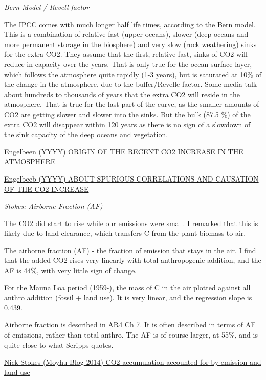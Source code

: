 \documentclass[
]{book}
\begin{document}
\emph{Bern Model / Revell factor}

The IPCC comes with much longer half life times, according to the Bern model. This is a combination of relative fast (upper oceans), slower (deep oceans and more permanent storage in the biosphere) and very slow (rock weathering) sinks for the extra CO2. They assume that the first, relative fast, sinks of CO2 will reduce in capacity over the years. That is only true for the ocean surface layer, which follows the atmosphere quite rapidly (1-3 years), but is saturated at 10\% of the change in the atmosphere, due to the buffer/Revelle factor. Some media talk about hundreds to thousands of years that the extra CO2 will reside in the atmosphere. That is true for the last part of the curve, as the smaller amounts of CO2 are getting slower and slower into the sinks. But the bulk (87.5 \%) of the extra CO2 will disappear within 120 years as there is no sign of a slowdown of the sink capacity of the deep oceans and vegetation.

\href{http://www.ferdinand-engelbeen.be/klimaat/co2_origin.html}{Engelbeen (YYYY) ORIGIN OF THE RECENT CO2 INCREASE IN THE ATMOSPHERE}

\href{http://www.ferdinand-engelbeen.be/klimaat/co2_variability.html}{Engelbeeb (YYYY) ABOUT SPURIOUS CORRELATIONS AND CAUSATION OF THE CO2 INCREASE}

\emph{Stokes: Airborne Fraction (AF)}

The CO2 did start to rise while our emissions were small. I remarked that this is likely due to land clearance, which transfers C from the plant biomass to air.

The airborne fraction (AF) - the fraction of emission that stays in the air. I find that the added CO2 rises very linearly with total anthropogenic addition, and the AF is 44\%, with very little sign of change.

For the Mauna Loa period (1959-), the mass of C in the air plotted against all anthro addition (fossil + land use). It is very linear, and the regression slope is 0.439.

Airborne fraction is described in \href{https://www.ipcc.ch/publications_and_data/ar4/wg1/en/ch7s7-3-1-3.html\#7-3-2}{AR4 Ch 7}. It is often described in terms of AF of emissions, rather than total anthro.
The AF is of course larger, at 55\%, and is quite close to what Scripps quotes.

\href{https://moyhu.blogspot.com/2014/08/co2-accumulation-accounted-for-by.html}{Nick Stokes (Moyhu Blog 2014) CO2 accumulation accounted for by emission and land use}
\end{document}
